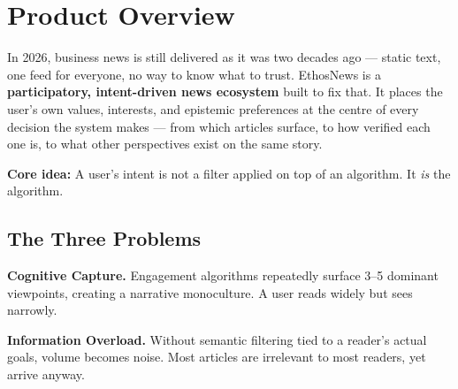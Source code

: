\documentclass[9pt,a4paper,twocolumn]{article}
\begin{document}

\section{Product Overview}

In 2026, business news is still delivered as it was two decades ago — static text, one feed for everyone, no way to know what to trust. EthosNews is a \textbf{participatory, intent-driven news ecosystem} built to fix that. It places the user's own values, interests, and epistemic preferences at the centre of every decision the system makes — from which articles surface, to how verified each one is, to what other perspectives exist on the same story.

\begin{redbox}
\small\textbf{Core idea:} A user's intent is not a filter applied on top of an algorithm. It \textit{is} the algorithm.
\end{redbox}

\subsection{The Three Problems}

\textbf{Cognitive Capture.} Engagement algorithms repeatedly surface 3–5 dominant viewpoints, creating a narrative monoculture. A user reads widely but sees narrowly.

\textbf{Information Overload.} Without semantic filtering tied to a reader's actual goals, volume becomes noise. Most articles are irrelevant to most readers, yet arrive anyway.
\end{document}
